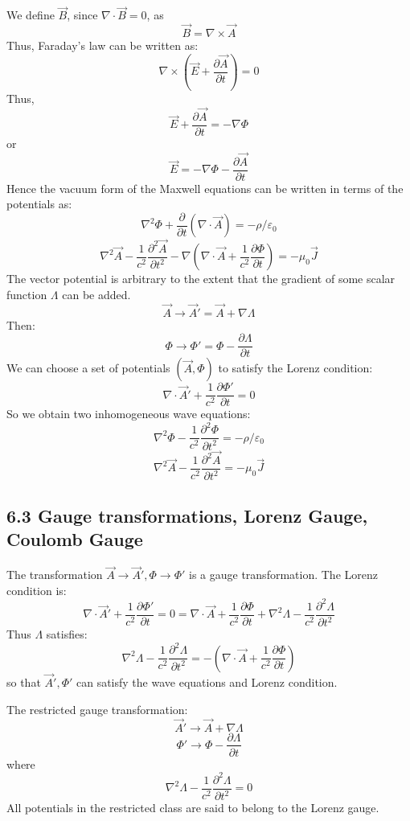 \documentclass{article}
\begin{document}
	We define $\vec{B}$, since $\nabla \cdot \vec{B} = 0$, as
	$$ \vec{B} = \nabla \times \vec{A} $$
	Thus, Faraday's law can be written as:
	$$ \nabla \times (\vec{E} + \frac{\partial \vec{A}}{\partial t}) = 0 $$
	Thus,
	$$ \vec{E} + \frac{\partial \vec{A}}{\partial t} = -\nabla \Phi $$
	or
	$$ \vec{E} = -\nabla \Phi - \frac{\partial \vec{A}}{\partial t} $$
	Hence the vacuum form of the Maxwell equations can be written in terms of the potentials as:
	$$ \nabla^2 \Phi + \frac{\partial}{\partial t}(\nabla \cdot \vec{A}) = -\rho / \varepsilon_0 $$
	$$ \nabla^2 \vec{A} - \frac{1}{c^2} \frac{\partial^2 \vec{A}}{\partial t^2} - \nabla(\nabla \cdot \vec{A} + \frac{1}{c^2} \frac{\partial \Phi}{\partial t}) = -\mu_0 \vec{J} $$
	The vector potential is arbitrary to the extent that the gradient of some scalar function $\Lambda$ can be added.
	$$ \vec{A} \rightarrow \vec{A}' = \vec{A} + \nabla \Lambda $$
	Then:
	$$ \Phi \rightarrow \Phi' = \Phi - \frac{\partial \Lambda}{\partial t} $$
	We can choose a set of potentials $(\vec{A}, \Phi)$ to satisfy the Lorenz condition:
	$$ \nabla \cdot \vec{A}' + \frac{1}{c^2} \frac{\partial \Phi'}{\partial t} = 0 $$
	So we obtain two inhomogeneous wave equations:
	$$ \nabla^2 \Phi - \frac{1}{c^2} \frac{\partial^2 \Phi}{\partial t^2} = -\rho / \varepsilon_0 $$
	$$ \nabla^2 \vec{A} - \frac{1}{c^2} \frac{\partial^2 \vec{A}}{\partial t^2} = -\mu_0 \vec{J} $$
	
	\subsection*{6.3 Gauge transformations, Lorenz Gauge, Coulomb Gauge}
	
	The transformation $\vec{A} \rightarrow \vec{A}', \Phi \rightarrow \Phi'$ is a gauge transformation.
	The Lorenz condition is:
	$$ \nabla \cdot \vec{A}' + \frac{1}{c^2} \frac{\partial \Phi'}{\partial t} = 0 = \nabla \cdot \vec{A} + \frac{1}{c^2} \frac{\partial \Phi}{\partial t} + \nabla^2 \Lambda - \frac{1}{c^2} \frac{\partial^2 \Lambda}{\partial t^2} $$
	Thus $\Lambda$ satisfies:
	$$ \nabla^2 \Lambda - \frac{1}{c^2} \frac{\partial^2 \Lambda}{\partial t^2} = -(\nabla \cdot \vec{A} + \frac{1}{c^2} \frac{\partial \Phi}{\partial t}) $$
	so that $\vec{A}', \Phi'$ can satisfy the wave equations and Lorenz condition.
	
	The restricted gauge transformation:
	$$ \vec{A}' \rightarrow \vec{A} + \nabla \Lambda $$
	$$ \Phi' \rightarrow \Phi - \frac{\partial \Lambda}{\partial t} $$
	where
	$$ \nabla^2 \Lambda - \frac{1}{c^2} \frac{\partial^2 \Lambda}{\partial t^2} = 0 $$
	All potentials in the restricted class are said to belong to the Lorenz gauge.
	
\end{document}
